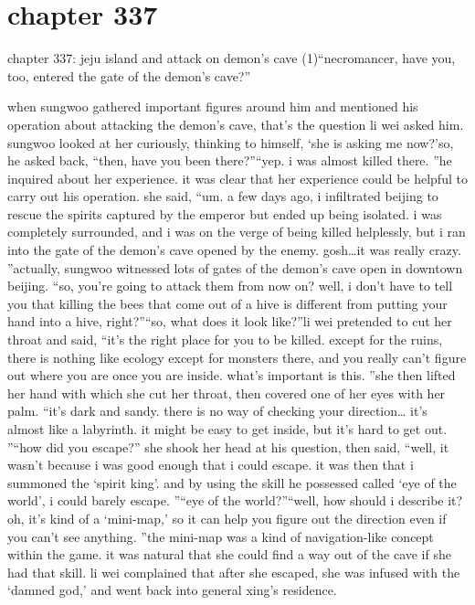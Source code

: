 \section{chapter 337}

chapter 337: jeju island and attack on demon’s cave (1)“necromancer, have you, too, entered the gate of the demon’s cave?”




when sungwoo gathered important figures around him and mentioned his operation about attacking the demon’s cave, that’s the question li wei asked him.
sungwoo looked at her curiously, thinking to himself, ‘she is asking me now?’so, he asked back, “then, have you been there?”“yep.
 i was almost killed there.
”he inquired about her experience.
 it was clear that her experience could be helpful to carry out his operation.
she said, “um.
 a few days ago, i infiltrated beijing to rescue the spirits captured by the emperor but ended up being isolated.
 i was completely surrounded, and i was on the verge of being killed helplessly, but i ran into the gate of the demon’s cave opened by the enemy.
 gosh…it was really crazy.
”actually, sungwoo witnessed lots of gates of the demon’s cave open in downtown beijing.
“so, you’re going to attack them from now on? well, i don’t have to tell you that killing the bees that come out of a hive is different from putting your hand into a hive, right?”“so, what does it look like?”li wei pretended to cut her throat and said, “it’s the right place for you to be killed.
 except for the ruins, there is nothing like ecology except for monsters there, and you really can’t figure out where you are once you are inside.
 what’s important is this.
”she then lifted her hand with which she cut her throat, then covered one of her eyes with her palm.
“it’s dark and sandy.
 there is no way of checking your direction… it’s almost like a labyrinth.
 it might be easy to get inside, but it’s hard to get out.
”“how did you escape?”
she shook her head at his question, then said, “well, it wasn’t because i was good enough that i could escape.
 it was then that i summoned the ‘spirit king’.
 and by using the skill he possessed called ‘eye of the world’, i could barely escape.
”“eye of the world?”“well, how should i describe it? oh, it’s kind of a ‘mini-map,’ so it can help you figure out the direction even if you can’t see anything.
”the mini-map was a kind of navigation-like concept within the game.
 it was natural that she could find a way out of the cave if she had that skill.
li wei complained that after she escaped, she was infused with the ‘damned god,’ and went back into general xing’s residence.
